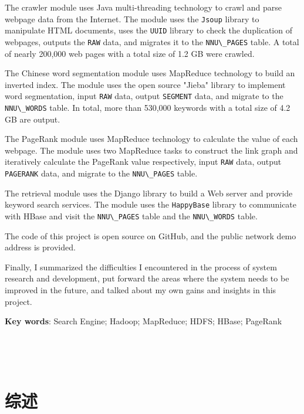 \documentclass{ctexart}
\newcommand{\code}[1]{\colorbox{backcolor}{\lstinline|#1|}}
\begin{document}
    The crawler module uses Java multi-threading technology to crawl and parse webpage data from the Internet. The module uses the \code{Jsoup} library to manipulate HTML documents, uses the \code{UUID} library to check the duplication of webpages, outputs the \code{RAW} data, and migrates it to the \code{NNU\_PAGES} table. A total of nearly 200,000 web pages with a total size of 1.2 GB were crawled.

    The Chinese word segmentation module uses MapReduce technology to build an inverted index. The module uses the open source "Jieba" library to implement word segmentation, input \code{RAW} data, output \code{SEGMENT} data, and migrate to the \code{NNU\_WORDS} table. In total, more than 530,000 keywords with a total size of 4.2 GB are output.

    The PageRank module uses MapReduce technology to calculate the value of each webpage. The module uses two MapReduce tasks to construct the link graph and iteratively calculate the PageRank value respectively, input \code{RAW} data, output \code{PAGERANK} data, and migrate to the \code{NNU\_PAGES} table.

    The retrieval module uses the Django library to build a Web server and provide keyword search services. The module uses the \code{HappyBase} library to communicate with HBase and visit the \code{NNU\_PAGES} table and the \code{NNU\_WORDS} table.

    The code of this project is open source on GitHub, and the public network demo address is provided.

    Finally, I summarized the difficulties I encountered in the process of system research and development, put forward the areas where the system needs to be improved in the future, and talked about my own gains and insights in this project.

    \textbf{Key words}: Search Engine; Hadoop; MapReduce; HDFS; HBase; PageRank

    \newpage

    \thispagestyle{firstpage}
    \textcolor{white}{.}
    \newpage

    \thispagestyle{table-of-contents}
    \tableofcontents

    \newpage

    \thispagestyle{firstpage}
    \textcolor{white}{.}
    \newpage

    \setcounter{page}{1}


    \section{综述}\label{sec:introduction}
\end{document}
